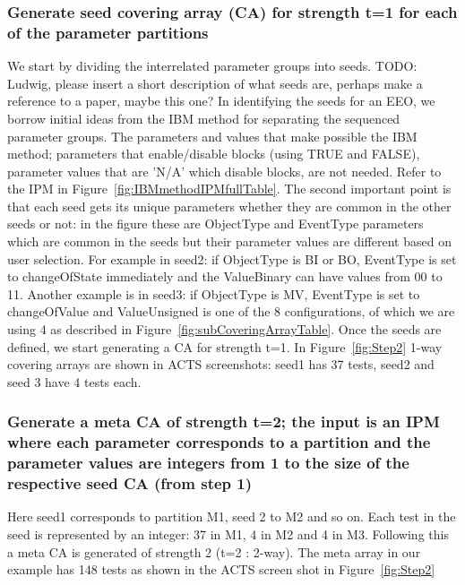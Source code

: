 \documentclass[conference]{IEEEtran}
\newcommand{\todo}[1]{}
\renewcommand{\todo}[1]{{\color{red} TODO: {#1}}}
\begin{document}
	\subsubsection{ Generate seed covering array (CA) for strength t=1 for each of the parameter partitions} 
	We start by dividing the interrelated parameter groups into seeds.
	 \todo{Ludwig, please insert a short description of what seeds are, perhaps make a reference to a paper, maybe this one? \cite{kampel2017combinatorial}  } 
	In identifying the seeds for an EEO, we borrow initial ideas from the IBM method for separating the sequenced parameter groups. 
	The parameters and values that make possible the IBM method; parameters that enable/disable blocks (using TRUE and FALSE), parameter values that are 'N/A' which disable blocks, are not needed.
	Refer to the IPM in Figure~\ref{fig:IBMmethodIPMfullTable}. 
	The second important point is that each seed gets its unique parameters whether they are common in the other seeds or not: in the figure these are ObjectType and EventType parameters which are common in the seeds but their parameter values are different based on user selection. 
	For example in seed2: if ObjectType is BI or BO, EventType is set to changeOfState immediately and the ValueBinary can have values from 00 to 11. 
	Another example is in seed3: if ObjectType is MV, EventType is set to changeOfValue and ValueUnsigned is one of the 8 configurations, of which we are using 4 as described in Figure~\ref{fig:subCoveringArrayTable}. 
	Once the seeds are defined, we start generating a CA for strength t=1. In Figure~\ref{fig:Step2} 1-way covering arrays are shown in ACTS screenshots: seed1 has 37 tests, seed2 and seed 3 have 4 tests each.
	
	
	
	
	\subsubsection {Generate a meta CA of strength t=2; the input is an IPM where each parameter corresponds to a partition and the parameter values are integers from 1 to the size of the respective seed CA (from step 1) } Here seed1 corresponds to partition M1, seed 2 to M2 and so on. Each test in the seed is represented by an integer: 37 in M1, 4 in M2 and 4 in M3. Following this a meta CA is generated of strength 2 (t=2 : 2-way). The meta array in our example has 148 tests as shown in the ACTS screen shot in Figure~\ref{fig:Step2}
	
\end{document}
